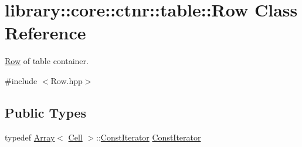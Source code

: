 \hypertarget{classlibrary_1_1core_1_1ctnr_1_1table_1_1_row}{}\section{library\+:\+:core\+:\+:ctnr\+:\+:table\+:\+:Row Class Reference}
\label{classlibrary_1_1core_1_1ctnr_1_1table_1_1_row}


\hyperlink{classlibrary_1_1core_1_1ctnr_1_1table_1_1_row}{Row} of table container.  




{\ttfamily \#include $<$Row.\+hpp$>$}

\subsection*{Public Types}
\begin{DoxyCompactItemize}
\item 
typedef \hyperlink{classlibrary_1_1core_1_1ctnr_1_1_array}{Array}$<$ \hyperlink{namespacelibrary_1_1core_1_1ctnr_1_1table_aac6007d595b2967513e8e6b89f6092f5}{Cell} $>$\+::\hyperlink{classlibrary_1_1core_1_1ctnr_1_1table_1_1_row_a293725deae1bf660d85c2d3ce905cb40}{Const\+Iterator} \hyperlink{classlibrary_1_1core_1_1ctnr_1_1table_1_1_row_a293725deae1bf660d85c2d3ce905cb40}{Const\+Iterator}
\end{DoxyCompactItemize}
